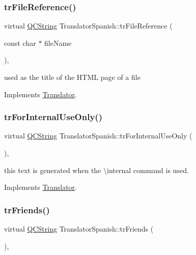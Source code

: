 \subsubsection{\texorpdfstring{trFileReference()}{trFileReference()}}
{\footnotesize\ttfamily virtual \mbox{\hyperlink{class_q_c_string}{Q\+C\+String}} Translator\+Spanish\+::tr\+File\+Reference (\begin{DoxyParamCaption}\item[{const char $\ast$}]{file\+Name }\end{DoxyParamCaption})\hspace{0.3cm}{\ttfamily [inline]}, {\ttfamily [virtual]}}

used as the title of the H\+T\+ML page of a file 

Implements \mbox{\hyperlink{class_translator}{Translator}}.

\mbox{\label{class_translator_spanish_aa40dff362c29d8e4e2c8e965342c600e}} 
\subsubsection{\texorpdfstring{trForInternalUseOnly()}{trForInternalUseOnly()}}
{\footnotesize\ttfamily virtual \mbox{\hyperlink{class_q_c_string}{Q\+C\+String}} Translator\+Spanish\+::tr\+For\+Internal\+Use\+Only (\begin{DoxyParamCaption}{ }\end{DoxyParamCaption})\hspace{0.3cm}{\ttfamily [inline]}, {\ttfamily [virtual]}}

this text is generated when the \textbackslash{}internal command is used. 

Implements \mbox{\hyperlink{class_translator}{Translator}}.

\mbox{\label{class_translator_spanish_add3b86a44cc5c222b254dc9d50ef5a19}} 
\subsubsection{\texorpdfstring{trFriends()}{trFriends()}}
{\footnotesize\ttfamily virtual \mbox{\hyperlink{class_q_c_string}{Q\+C\+String}} Translator\+Spanish\+::tr\+Friends (\begin{DoxyParamCaption}{ }\end{DoxyParamCaption})\hspace{0.3cm}{\ttfamily [inline]}, {\ttfamily [virtual]}}

